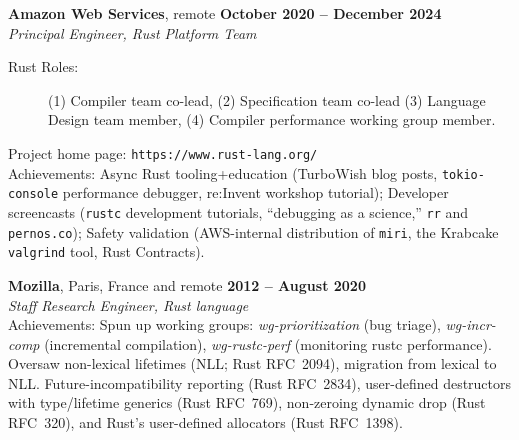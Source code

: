 \documentclass[margin,line,draft]{res}
\begin{document}
\begin{resume}
    \textbf{Amazon Web Services}, remote \hfill \textbf{October 2020 -- December 2024}\\\vspace{1mm}%
    \textsl{Principal Engineer, Rust Platform Team}
\begin{description}
\item[\rm Rust Roles:]
  (1) Compiler team co-lead, (2) Specification team co-lead (3) Language Design team member, (4) Compiler performance working group member.
\end{description}
    \vspace{-2mm}
    Project home page: {\tt https://www.rust-lang.org/} \\
    Achievements: Async Rust tooling+education (TurboWish blog posts, \texttt{tokio-console} performance debugger, re:Invent workshop tutorial);
    Developer screencasts (\texttt{rustc} development tutorials, ``debugging as a science,'' \texttt{rr} and \texttt{pernos.co}); Safety validation (AWS-internal distribution of \texttt{miri}, the Krabcake \texttt{valgrind} tool, Rust Contracts).

    \textbf{Mozilla}, Paris, France and remote \hfill \textbf{2012 -- August 2020}\\\vspace{1mm}%
    \textsl{Staff Research Engineer, Rust language} \\
    Achievements: Spun up working groups: \emph{wg-prioritization} (bug triage), \emph{wg-incr-comp} (incremental compilation), \emph{wg-rustc-perf} (monitoring rustc performance). Oversaw non-lexical lifetimes (NLL; Rust RFC~2094), migration from lexical to NLL. Future-incompatibility reporting (Rust RFC~2834), user-defined destructors with type/lifetime generics (Rust RFC~769), non-zeroing dynamic drop (Rust RFC~320),  and Rust's user-defined allocators (Rust RFC~1398).
    

\end{resume}
\end{document}
